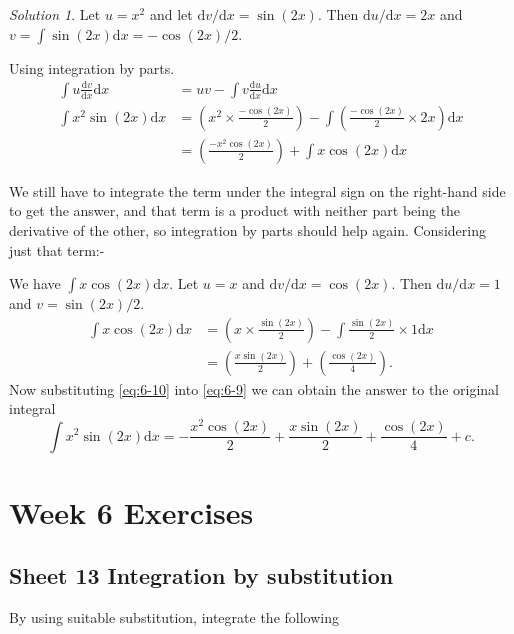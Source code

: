 \documentclass[
  english,
  11pt,
  oneside]{book}
\newcommand{\slide}{}
\theoremstyle{definition}
\theoremstyle{definition}
\theoremstyle{definition}
\theoremstyle{definition}
\theoremstyle{remark}
\newtheorem*{solution}{Solution}
\begin{document}
\begin{solution}
Let \(u = x^2\) and let \(\mathrm{d}v/\mathrm{d}x = \sin(2x)\). Then \(\mathrm{d}u/\mathrm{d}x = 2x\) and \(v = \displaystyle\int \sin(2x)\mathrm{d}x = -\cos(2x)/2\).

Using integration by parts.
\begin{align}
\int u\frac{\mathrm{d}v}{\mathrm{d}x}\mathrm{d}x& = uv-\int v\frac{\mathrm{d}u}{\mathrm{d}x}\mathrm{d}x\\
\int x^2\sin(2x)\mathrm{d}x&=\left(x^2\times\frac{-\cos(2x)}{2}\right)-\int\left(\frac{-\cos(2x)}{2}\times2x\right)\mathrm{d}x\\
&=\left(\frac{-x^2\cos(2x)}{2}\right)+\int x\cos(2x)\mathrm{d}x
\label{eq:6-9}
\end{align}

We still have to integrate the term under the integral sign on the right-hand side to get the answer, and that term is a product with neither part being the derivative of the other, so integration by parts should help again. Considering just that term:-

\slide

We have \(\displaystyle\int x\cos(2x)\mathrm{d}x\). Let \(u=x\) and \(\mathrm{d}v/\mathrm{d}x = \cos(2x)\). Then \(\mathrm{d}u/\mathrm{d}x = 1\) and \(v=\sin(2x)/2\).
\begin{align}
\int x\cos(2x)\mathrm{d}x &= \left(x\times\frac{\sin(2x)}{2}\right) - \int\frac{\sin(2x)}{2}\times1\mathrm{d}x\\
&= \left(\frac{x\sin(2x)}2\right)+\left(\frac{\cos(2x)}4\right).
\label{eq:6-10}
\end{align}
Now substituting \eqref{eq:6-10} into \eqref{eq:6-9} we can obtain the answer to the original integral
\[
\int x^2\sin(2x)\mathrm{d}x = -\frac{x^2\cos(2x)}2+\frac{x\sin(2x)}2+\frac{\cos(2x)}4 + c.
\]
\end{solution}

\chapter*{Week 6 Exercises}\label{week-6-exercises}

\section{Sheet 13 Integration by substitution}\label{sheet-13-integration-by-substitution}

By using suitable substitution, integrate the following
\end{document}
